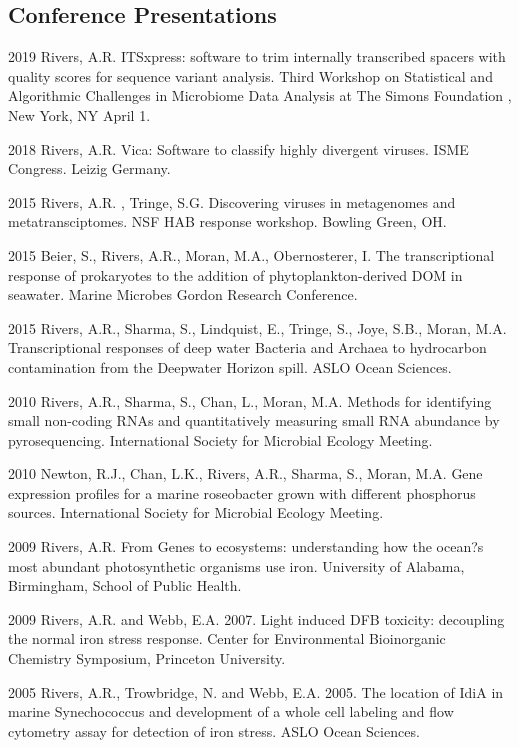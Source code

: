 \documentclass[12pt,letterpaper]{report}
\begin{document}
    \subsection*{Conference Presentations}

    \begin{tablist}
    	
\item[2019 ] \tab Rivers, A.R. ITSxpress: software to trim internally transcribed spacers with quality scores for sequence variant analysis. Third Workshop on Statistical and Algorithmic Challenges in Microbiome Data Analysis at The Simons Foundation , New York, NY April 1. 

\item[2018 ] \tab Rivers, A.R. Vica: Software to classify highly divergent viruses. ISME Congress. Leizig Germany.

\item[2015 ] \tab Rivers, A.R. , Tringe, S.G. Discovering viruses in metagenomes and metatransciptomes. NSF HAB response workshop. Bowling Green, OH.

\item[2015 ] \tab  Beier, S., Rivers, A.R., Moran, M.A., Obernosterer, I. The transcriptional response of prokaryotes to the addition of phytoplankton-derived DOM in seawater. Marine Microbes Gordon Research Conference. 

\item[2015] \tab Rivers, A.R., Sharma, S., Lindquist, E., Tringe, S., Joye, S.B., Moran, M.A.  Transcriptional responses of deep water Bacteria and Archaea to hydrocarbon contamination from the Deepwater Horizon spill. ASLO Ocean Sciences. 

\item[2010] \tab Rivers, A.R., Sharma, S., Chan, L., Moran, M.A. Methods for identifying small non-coding RNAs and quantitatively measuring small RNA abundance by pyrosequencing. International Society for Microbial Ecology Meeting.

\item[2010] \tab Newton, R.J., Chan, L.K., Rivers, A.R., Sharma, S., Moran, M.A.  Gene expression profiles for a marine roseobacter grown with different phosphorus sources. International Society for Microbial Ecology Meeting.

\item[2009] \tab Rivers, A.R. From Genes to ecosystems: understanding how the ocean?s most abundant photosynthetic organisms use iron. University of Alabama, Birmingham, School of Public Health.

\item[2009] \tab Rivers, A.R. and Webb, E.A. 2007. Light induced DFB toxicity: decoupling the normal iron stress response. Center for Environmental Bioinorganic Chemistry Symposium, Princeton University. 

\item[2005] \tab Rivers, A.R., Trowbridge, N. and Webb, E.A. 2005. The location of IdiA in marine Synechococcus and development of a whole cell labeling and flow cytometry assay for detection of iron stress. ASLO Ocean Sciences.

		

    \end{tablist}
\end{document}
